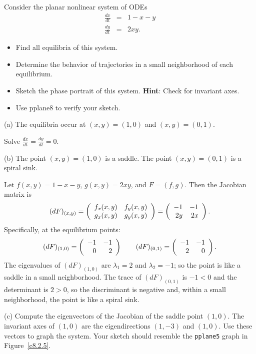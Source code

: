 \documentclass{ximera}
\begin{document}
\begin{exercise} \label{c8.2.5}
Consider the planar nonlinear system of ODEs
\begin{eqnarray*}
\frac{dx}{dt} & = & 1 - x - y \\
\frac{dy}{dt} & = & 2xy. 
\end{eqnarray*}
\begin{itemize}
\item[(a)] Find all equilibria of this system.
\item[(b)] Determine the behavior of trajectories in a small
neighborhood of each equilibrium.
\item[(c)] Sketch the phase portrait of this system.  {\bf Hint}: Check
for invariant axes.
\item[(d)] Use {\sf pplane8} to verify your sketch.
\end{itemize}

\begin{solution}

(a) \ans The equilibria occur at $(x,y) = (1,0)$ and $(x,y) = (0,1)$.

\soln Solve $\frac{dx}{dt} = \frac{dy}{dt} = 0$.

(b) \ans The point $(x,y) = (1,0)$ is a saddle.  The point $(x,y) = (0,1)$
is a spiral sink.

\soln Let $f(x,y) = 1 - x - y$, $g(x,y) = 2xy$,
and $F = (f,g)$.  Then the Jacobian matrix is
\[
(dF)_{(x,y)} = \left(\begin{array}{rr} f_x(x,y) & f_y(x,y)\\ g_x(x,y) &g_y(x,y)\end{array}\right)
= \left(\begin{array}{rr} -1 & -1\\ 2y &2x\end{array}\right).
\]
Specifically, at the equilibrium points:
\[
(dF)_{(1,0)} = \left(\begin{array}{rr} -1 & -1\\ 0 &2\end{array}\right) \qquad
(dF)_{(0,1)} = \left(\begin{array}{rr} -1 & -1\\ 2 &0\end{array}\right).
\]
The eigenvalues of $(dF)_{(1,0)}$ are $\lambda_1 = 2$ and $\lambda_2 = -1$;
so the point is like a saddle in a small neighborhood.  The trace of
$(dF)_{(0,1)}$ is $-1 < 0$ and the determinant is $2 > 0$, so the
discriminant is negative and, within a small neighborhood, the point
is like a spiral sink.

(c) Compute the eigenvectors of the Jacobian of the saddle point $(1,0)$.
The invariant axes of $(1,0)$ are the eigendirections $(1,-3)$ and
$(1,0)$.  Use these vectors to graph the system.  Your sketch should
resemble the {\tt pplane5} graph in Figure~\ref{c8.2.5}.

\begin{figure}[htb]
                       \centerline{%
                       }
\end{figure}


\end{solution}
\end{exercise}
\end{document}
